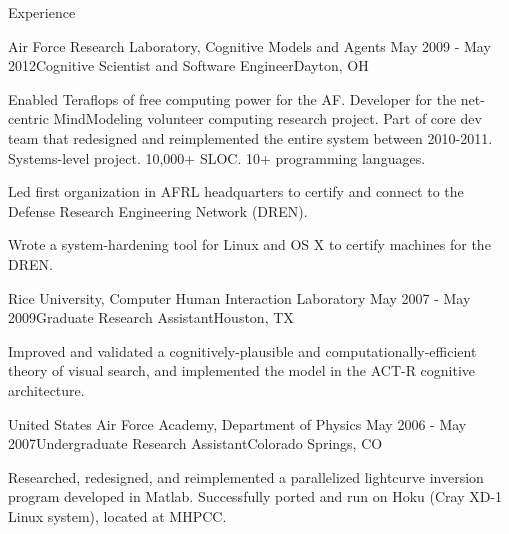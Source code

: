 \begin{rSection}{Experience}
  \begin{rSubsection}{Air Force Research Laboratory, Cognitive Models and Agents}
    {May 2009 - May 2012}{Cognitive Scientist and Software Engineer}{Dayton, OH}
  \item 
    Enabled Teraflops of free computing power for the AF.
    Developer for the net-centric MindModeling volunteer computing research project.
    Part of core dev team that redesigned and reimplemented the entire system between 2010-2011.
    Systems-level project. 10,000+ SLOC. 10+ programming languages. 
  \item
    Led first organization in AFRL headquarters to certify and connect to the Defense Research Engineering Network (DREN).
  \item
    Wrote a system-hardening tool for Linux and OS X to certify machines for the DREN.
  \end{rSubsection}

  \begin{rSubsection}{Rice University, Computer Human Interaction Laboratory}
    {May 2007 - May 2009}{Graduate Research Assistant}{Houston, TX}
  \item Improved and validated a cognitively-plausible and computationally-efficient theory of visual search, 
    and implemented the model in the ACT-R cognitive architecture.
  \end{rSubsection}

  \begin{rSubsection}{United States Air Force Academy, Department of Physics}
    {May 2006 - May 2007}{Undergraduate Research Assistant}{Colorado Springs, CO}
  \item Researched, redesigned, and reimplemented a parallelized lightcurve inversion program developed in Matlab.
    Successfully ported and run on Hoku (Cray XD-1 Linux system), located at MHPCC.
  \end{rSubsection}


\end{rSection}
